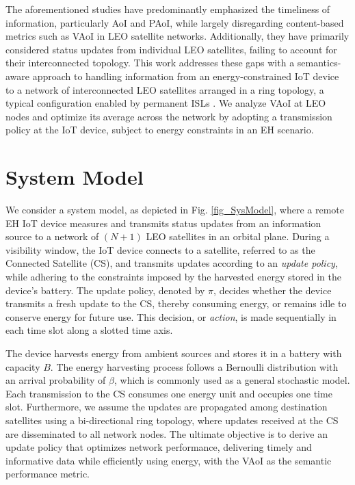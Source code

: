 \documentclass[lettersize,journal]{IEEEtran}
\begin{document}
    The aforementioned studies have predominantly emphasized the timeliness of information, particularly AoI and PAoI, while largely disregarding content-based metrics such as VAoI in LEO satellite networks. Additionally, they have primarily considered status updates from individual LEO satellites, failing to account for their interconnected topology.
    This work addresses these gaps with a semantics-aware approach to handling information from an energy-constrained IoT device to a network of interconnected LEO satellites arranged in a ring topology, a typical configuration enabled by permanent ISLs \cite{chaudhry2021laser}. We analyze VAoI at LEO nodes and optimize its average across the network by adopting a transmission policy at the IoT device, subject to energy constraints in an EH scenario. 

    \section{System Model}

    We consider a system model, as depicted in Fig. \ref{fig_SysModel}, where a remote EH IoT device measures and transmits status updates from an information source to a network of $(N+1)$ LEO satellites in an orbital plane.
    During a visibility window, the IoT device connects to a satellite, referred to as the Connected Satellite (CS), and transmits updates according to an \emph{update policy}, while adhering to the constraints imposed by the harvested energy stored in the device's battery. The update policy, denoted by $\pi$, decides whether the device transmits a fresh update to the CS, thereby consuming energy, or remains idle to conserve energy for future use. This decision, or \emph{action}, is made sequentially in each time slot along a slotted time axis.
    
    The device harvests energy from ambient sources and stores it in a battery with capacity $B$. The energy harvesting process follows a Bernoulli distribution with an arrival probability of $\beta$, which is commonly used as a general stochastic model\cite{dong2015near,delfani2024version}. Each transmission to the CS consumes one energy unit and occupies one time slot.
    Furthermore, we assume the updates are propagated among destination satellites using a bi-directional ring topology, where updates received at the CS are disseminated to all network nodes. 
    The ultimate objective is to derive an update policy that optimizes network performance, delivering timely and informative data while efficiently using energy, with the VAoI as the semantic performance metric.
    
\end{document}
